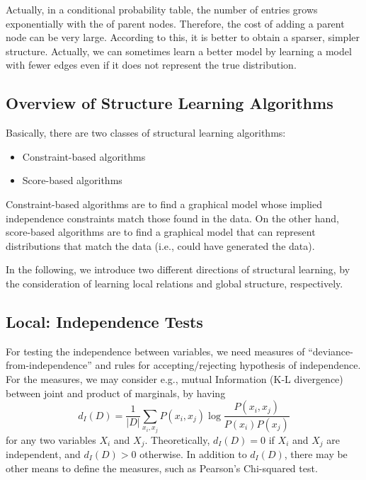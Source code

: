 Actually, in a conditional probability table, the number of entries grows exponentially with the of parent nodes. Therefore, the cost of adding a parent node can be very large. According to this, it is better to obtain a sparser, simpler structure.  
Actually, we can sometimes learn a better model by learning a model with fewer edges even if it does not represent the true distribution.

\subsection{Overview of Structure Learning Algorithms}

Basically, there are two classes of structural learning algorithms: 
\begin{itemize}
\item Constraint-based algorithms
\item Score-based algorithms 
\end{itemize}

Constraint-based algorithms are to find a graphical model whose implied independence constraints match those found in the data. On the other hand, score-based algorithms are to find a graphical model that can represent distributions that match the data (i.e., could have generated the data).

In the following, we introduce two 
different directions of structural learning, by  the consideration of learning local relations and global structure, respectively. 

\subsection*{Local: Independence Tests}

For testing the independence between variables, we need measures of ``deviance-from-independence'' and rules  for accepting/rejecting hypothesis of independence. 
%
For the measures, we may consider e.g., mutual Information (K-L divergence) between joint and product of marginals, by having 
\begin{equation}\label{equ:miedges}
    d_I(D) = \frac{1}{|D|}\sum_{x_i,x_j}P(x_i,x_j)\log \frac{P(x_i,x_j)}{P(x_i)P(x_j)}
\end{equation}
for any two variables $X_i$ and $X_j$. 
Theoretically, $d_I(D)=0$ if $X_i$ and $X_j$ are independent, and $d_I(D)>0$ otherwise. In addition to $d_I(D)$, there may be other means to define the measures, such as Pearson’s Chi-squared test.  

